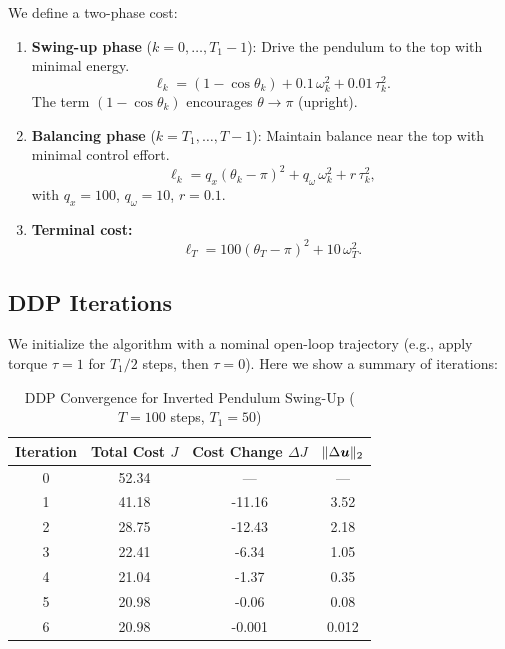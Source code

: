 We define a two-phase cost:
\begin{enumerate}
\item \textbf{Swing-up phase} ($k = 0, \ldots, T_1 - 1$): Drive the pendulum to the top with minimal energy.
      \begin{equation}
      \ell_k = (1 - \cos\theta_k) + 0.1\,\omega_k^2 + 0.01\,\tau_k^2.
      \label{eq:ch5:pendulum-cost-swing}
      \end{equation}
      The term $(1 - \cos\theta_k)$ encourages $\theta \to \pi$ (upright).

\item \textbf{Balancing phase} ($k = T_1, \ldots, T-1$): Maintain balance near the top with minimal control effort.
      \begin{equation}
      \ell_k = q_x(\theta_k - \pi)^2 + q_\omega\,\omega_k^2 + r\,\tau_k^2,
      \label{eq:ch5:pendulum-cost-balance}
      \end{equation}
      with $q_x = 100$, $q_\omega = 10$, $r = 0.1$.

\item \textbf{Terminal cost:}
      \begin{equation}
      \ell_T = 100(\theta_T - \pi)^2 + 10\,\omega_T^2.
      \label{eq:ch5:pendulum-cost-terminal}
      \end{equation}
\end{enumerate}

\subsection{DDP Iterations}

We initialize the algorithm with a nominal open-loop trajectory (e.g., apply torque $\tau = 1$ for $T_1 / 2$ steps,
then $\tau = 0$). Here we show a summary of iterations:

\begin{table}[H]
\centering
\caption{DDP Convergence for Inverted Pendulum Swing-Up ($T = 100$ steps, $T_1 = 50$)}
\label{tab:ch5:ddp-convergence}
\begin{tabular}{c c c c}
\hline
Iteration & Total Cost $J$ & Cost Change $\Delta J$ & $\|\Delta\bm{u}\|_2$ \\
\hline
0 & 52.34 & --- & --- \\
1 & 41.18 & -11.16 & 3.52 \\
2 & 28.75 & -12.43 & 2.18 \\
3 & 22.41 & -6.34 & 1.05 \\
4 & 21.04 & -1.37 & 0.35 \\
5 & 20.98 & -0.06 & 0.08 \\
6 & 20.98 & -0.001 & 0.012 \\
\hline
\end{tabular}
\end{table}

